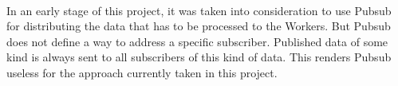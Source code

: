 \paragraph{}
In an early stage of this project, it was taken into consideration to use Pubsub for distributing the data that has to be processed to the Workers. But Pubsub does not define a way to address a specific subscriber. Published data of some kind is always sent to all subscribers of this kind of data. This renders Pubsub useless for the approach currently taken in this project.


